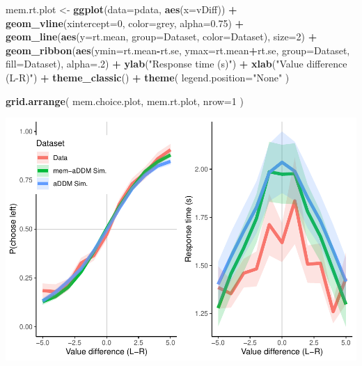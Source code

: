 \documentclass[
]{book}
\newenvironment{Shaded}{\begin{snugshade}}{\end{snugshade}}
\newcommand{\AttributeTok}[1]{\textcolor[rgb]{0.13,0.29,0.53}{#1}}
\newcommand{\DecValTok}[1]{\textcolor[rgb]{0.00,0.00,0.81}{#1}}
\newcommand{\FloatTok}[1]{\textcolor[rgb]{0.00,0.00,0.81}{#1}}
\newcommand{\FunctionTok}[1]{\textcolor[rgb]{0.13,0.29,0.53}{\textbf{#1}}}
\newcommand{\NormalTok}[1]{#1}
\newcommand{\OtherTok}[1]{\textcolor[rgb]{0.56,0.35,0.01}{#1}}
\newcommand{\SpecialCharTok}[1]{\textcolor[rgb]{0.81,0.36,0.00}{\textbf{#1}}}
\newcommand{\StringTok}[1]{\textcolor[rgb]{0.31,0.60,0.02}{#1}}
\begin{document}
\begin{Shaded}
\begin{Highlighting}[]
\NormalTok{mem.rt.plot }\OtherTok{\textless{}{-}} \FunctionTok{ggplot}\NormalTok{(}\AttributeTok{data=}\NormalTok{pdata, }\FunctionTok{aes}\NormalTok{(}\AttributeTok{x=}\NormalTok{vDiff)) }\SpecialCharTok{+}
  \FunctionTok{geom\_vline}\NormalTok{(}\AttributeTok{xintercept=}\DecValTok{0}\NormalTok{, }\AttributeTok{color=}\StringTok{\textquotesingle{}grey\textquotesingle{}}\NormalTok{, }\AttributeTok{alpha=}\FloatTok{0.75}\NormalTok{) }\SpecialCharTok{+}
  \FunctionTok{geom\_line}\NormalTok{(}\FunctionTok{aes}\NormalTok{(}\AttributeTok{y=}\NormalTok{rt.mean, }\AttributeTok{group=}\NormalTok{Dataset, }\AttributeTok{color=}\NormalTok{Dataset), }\AttributeTok{size=}\DecValTok{2}\NormalTok{) }\SpecialCharTok{+}
  \FunctionTok{geom\_ribbon}\NormalTok{(}\FunctionTok{aes}\NormalTok{(}\AttributeTok{ymin=}\NormalTok{rt.mean}\SpecialCharTok{{-}}\NormalTok{rt.se, }\AttributeTok{ymax=}\NormalTok{rt.mean}\SpecialCharTok{+}\NormalTok{rt.se, }\AttributeTok{group=}\NormalTok{Dataset, }\AttributeTok{fill=}\NormalTok{Dataset), }\AttributeTok{alpha=}\NormalTok{.}\DecValTok{2}\NormalTok{) }\SpecialCharTok{+}
  \FunctionTok{ylab}\NormalTok{(}\StringTok{"Response time (s)"}\NormalTok{) }\SpecialCharTok{+}
  \FunctionTok{xlab}\NormalTok{(}\StringTok{"Value difference (L{-}R)"}\NormalTok{) }\SpecialCharTok{+}
  \FunctionTok{theme\_classic}\NormalTok{() }\SpecialCharTok{+}
  \FunctionTok{theme}\NormalTok{(}
    \AttributeTok{legend.position=}\StringTok{"None"}
\NormalTok{  )}

\FunctionTok{grid.arrange}\NormalTok{(}
\NormalTok{  mem.choice.plot, mem.rt.plot,}
  \AttributeTok{nrow=}\DecValTok{1}
\NormalTok{)}
\end{Highlighting}
\end{Shaded}

\includegraphics{LateNightBayes_files/figure-latex/unnamed-chunk-53-1.pdf}
\end{document}
